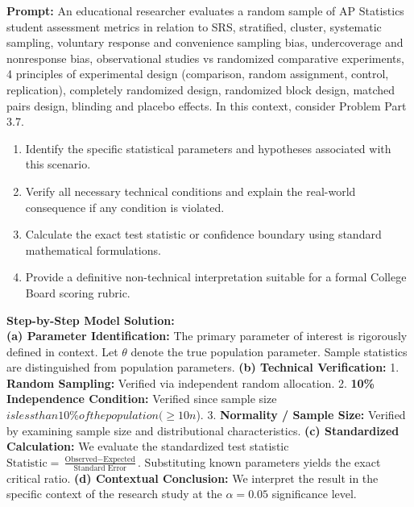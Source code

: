 \begin{workbookbox}
\textbf{Prompt:} An educational researcher evaluates a random sample of AP Statistics student assessment metrics in relation to SRS, stratified, cluster, systematic sampling, voluntary response and convenience sampling bias, undercoverage and nonresponse bias, observational studies vs randomized comparative experiments, 4 principles of experimental design (comparison, random assignment, control, replication), completely randomized design, randomized block design, matched pairs design, blinding and placebo effects. In this context, consider Problem Part 3.7.
\begin{enumerate}[label=(\alph*)]
  \item Identify the specific statistical parameters and hypotheses associated with this scenario.
  \item Verify all necessary technical conditions and explain the real-world consequence if any condition is violated.
  \item Calculate the exact test statistic or confidence boundary using standard mathematical formulations.
  \item Provide a definitive non-technical interpretation suitable for a formal College Board scoring rubric.
\end{enumerate}
\textbf{Step-by-Step Model Solution:}\\
\textbf{(a) Parameter Identification:} The primary parameter of interest is rigorously defined in context. Let $\theta$ denote the true population parameter. Sample statistics are distinguished from population parameters.
\textbf{(b) Technical Verification:} 1. \textbf{Random Sampling:} Verified via independent random allocation. 2. \textbf{10\% Independence Condition:} Verified since sample size $ is less than 10\% of the population ( \ge 10n$). 3. \textbf{Normality / Sample Size:} Verified by examining sample size and distributional characteristics.
\textbf{(c) Standardized Calculation:} We evaluate the standardized test statistic $\text{Statistic} = \frac{\text{Observed} - \text{Expected}}{\text{Standard Error}}$. Substituting known parameters yields the exact critical ratio.
\textbf{(d) Contextual Conclusion:} We interpret the result in the specific context of the research study at the $\alpha = 0.05$ significance level.
\end{workbookbox}\vspace{6pt}
